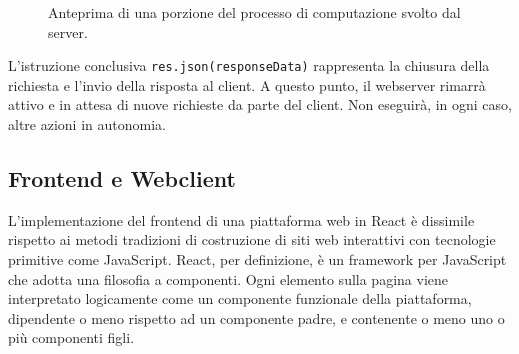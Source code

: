 \begin{figure}[ht!]
    \centering
    \caption{Anteprima di una porzione del processo di computazione svolto dal server.}
    \label{fig:esempio}
\end{figure}


L'istruzione conclusiva \verb|res.json(responseData)| rappresenta la chiusura della richiesta e l'invio della risposta al client. A questo punto, il webserver rimarrà attivo e in attesa di nuove richieste da parte del client. Non eseguirà, in ogni caso, altre azioni in autonomia.

\subsection{Frontend e Webclient}

L'implementazione del frontend di una piattaforma web in React è dissimile rispetto ai metodi tradizioni di costruzione di siti web interattivi con tecnologie primitive come JavaScript. React, per definizione, è un framework per JavaScript che adotta una filosofia a componenti. Ogni elemento sulla pagina viene interpretato logicamente come un componente funzionale della piattaforma, dipendente o meno rispetto ad un componente padre, e contenente o meno uno o più componenti figli. 

